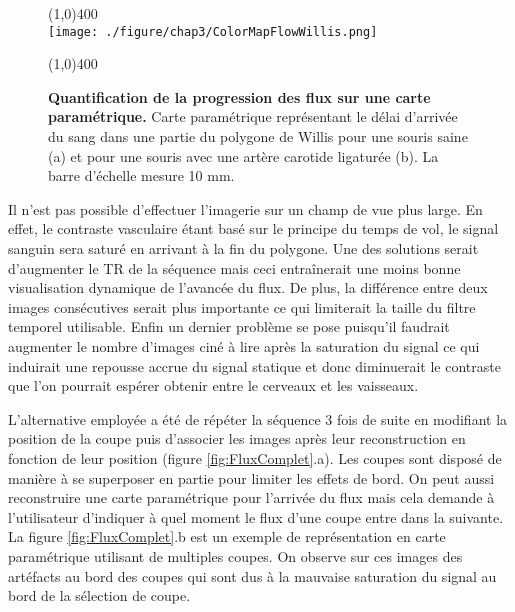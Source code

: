 \begin{figure}[H]
\centering \line(1,0){400} \\
\texttt{[image: ./figure/chap3/ColorMapFlowWillis.png]}
\caption[Quantification de la progression des flux sur une carte paramétrique.]{\label{fig:ColorMapFlowWillis} \textbf{Quantification de la progression des flux sur une carte paramétrique.} Carte paramétrique représentant le délai d'arrivée du sang dans une partie du polygone de Willis pour une souris saine (a) et pour une souris avec une artère carotide ligaturée (b). La barre d'échelle mesure 10 mm.}
\line(1,0){400} \\ \end{figure}

Il n'est pas possible d'effectuer l'imagerie sur un champ de vue plus large. En effet, le contraste vasculaire étant basé sur le principe du temps de vol, le signal sanguin sera saturé en arrivant à la fin du polygone. Une des solutions serait d'augmenter le TR de la séquence mais ceci entraînerait une moins bonne visualisation dynamique de l'avancée du flux. De plus, la différence entre deux images consécutives serait plus importante ce qui limiterait la taille du filtre temporel utilisable. Enfin un dernier problème se pose puisqu'il faudrait augmenter le nombre d'images ciné à lire après la saturation du signal ce qui induirait une repousse accrue du signal statique et donc diminuerait le contraste que l'on pourrait espérer obtenir entre le cerveaux et les vaisseaux.

L'alternative employée a été de répéter la séquence 3 fois de suite en modifiant la position de la coupe puis d'associer les images après leur reconstruction en fonction de leur position (figure \ref{fig:FluxComplet}.a). Les coupes sont disposé de manière à se superposer en partie pour limiter les effets de bord. On peut aussi reconstruire une carte paramétrique pour l'arrivée du flux mais cela demande à l'utilisateur d'indiquer à quel moment le flux d'une coupe entre dans la suivante. La figure \ref{fig:FluxComplet}.b est un exemple de représentation en carte paramétrique utilisant de multiples coupes. On observe sur ces images des artéfacts au bord des coupes qui sont dus à la mauvaise saturation du signal au bord de la sélection de coupe.


